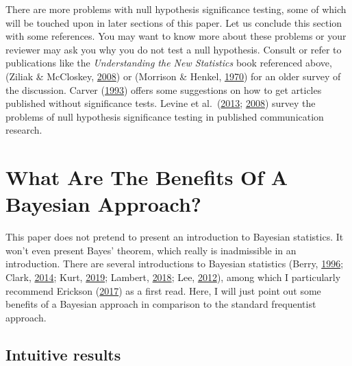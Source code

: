 \documentclass[
  english,
  doc]{apa6}
\begin{document}
There are more problems with null hypothesis significance testing, some of which will be touched upon in later sections of this paper. Let us conclude this section with some references. You may want to know more about these problems or your reviewer may ask you why you do not test a null hypothesis. Consult or refer to publications like the \emph{Understanding the New Statistics} book referenced above, (Ziliak \& McCloskey, \protect\hyperlink{ref-ziliakCultStatisticalSignificance2008}{2008}) or (Morrison \& Henkel, \protect\hyperlink{ref-morrisonSignificanceTestControversy1970}{1970}) for an older survey of the discussion. Carver (\protect\hyperlink{ref-carverCaseStatisticalSignificance1993}{1993}) offers some suggestions on how to get articles published without significance tests. Levine et al.~(\protect\hyperlink{ref-LevineQuantitativeCommunicationResearch2013}{2013}; \protect\hyperlink{ref-LevineCriticalAssessmentNull2008}{2008}) survey the problems of null hypothesis significance testing in published communication research.

\hypertarget{what-are-the-benefits-of-a-bayesian-approach}{%
\section{What Are The Benefits Of A Bayesian Approach?}\label{what-are-the-benefits-of-a-bayesian-approach}}

This paper does not pretend to present an introduction to Bayesian statistics. It won't even present Bayes' theorem, which really is inadmissible in an introduction. There are several introductions to Bayesian statistics (Berry, \protect\hyperlink{ref-BerryStatisticsBayesianPerspective1996}{1996}; Clark, \protect\hyperlink{ref-ClarkBayesianBasicsConceptual2014}{2014}; Kurt, \protect\hyperlink{ref-kurtBayesianStatisticsFun2019}{2019}; Lambert, \protect\hyperlink{ref-lambertStudentsGuideBayesian2018}{2018}; Lee, \protect\hyperlink{ref-leeBayesianStatisticsIntroduction2012}{2012}), among which I particularly recommend Erickson (\protect\hyperlink{ref-EricksonBeginningBayes2017}{2017}) as a first read. Here, I will just point out some benefits of a Bayesian approach in comparison to the standard frequentist approach.

\hypertarget{intuitive-results}{%
\subsection{Intuitive results}\label{intuitive-results}}
\end{document}
